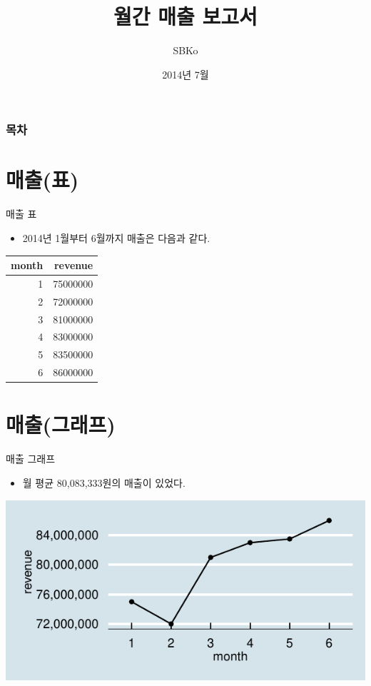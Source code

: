 \documentclass{beamer}\usepackage[]{graphicx}\usepackage[]{color}
\title{월간 매출 보고서}
\author{SBKo}
\date{2014년 7월}
\makeatletter
\def\maxwidth{ %
  \ifdim\Gin@nat@width>\linewidth
    \linewidth
  \else
    \Gin@nat@width
  \fi
}
\newenvironment{knitrout}{}{} %
\makeatother
\begin{document}
\begin{frame}
\titlepage
\end{frame}

\begin{frame} 
\frametitle{목차} 
\tableofcontents
\end{frame}


\section{매출(표)}
\begin{frame}{매출 표}

\begin{itemize}
  \item 2014년 1월부터 6월까지 매출은 다음과 같다.
\end{itemize}



\begin{tabular}{r|r}
\hline
month & revenue\\
\hline
1 & 75000000\\
\hline
2 & 72000000\\
\hline
3 & 81000000\\
\hline
4 & 83000000\\
\hline
5 & 83500000\\
\hline
6 & 86000000\\
\hline
\end{tabular}


\end{frame}

\section{매출(그래프)}

\begin{frame}{매출 그래프}
\begin{itemize}
  \item 월 평균 80,083,333원의 매출이 있었다.
\end{itemize}

\begin{knitrout}
\color{fgcolor}
\includegraphics[width=\maxwidth]{figure/unnamed-chunk-4} 

\end{knitrout}


\end{frame}
\end{document}
